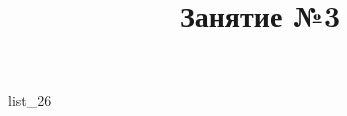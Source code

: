 \documentclass[12pt, a4paper]{article}
\begin{document}
	\title{Занятие №3}
	{list_26}
\end{document}
